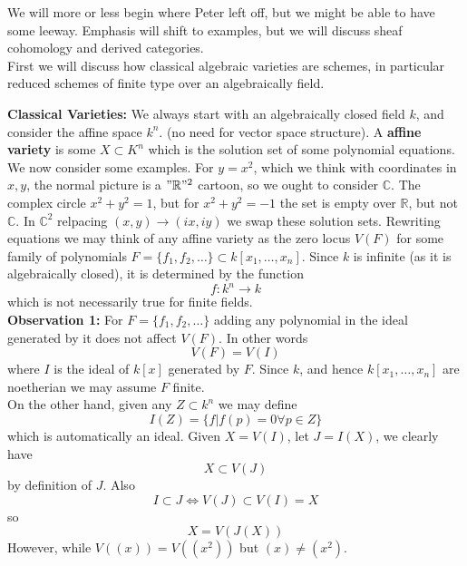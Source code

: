 \documentclass{article}
\theoremstyle{definition}
\theoremstyle{definition}
\theoremstyle{remark}
\newcommand{\R}{\mathbb{R}}
\newcommand{\C}{\mathbb{C}}
\begin{document}
We will more or less begin where Peter left off, but we might be able to have some leeway.
Emphasis will shift to examples, but we will discuss sheaf cohomology and derived categories.\\

First we will discuss how classical algebraic varieties are schemes, in particular reduced schemes of finite type over an algebraically field.

\textbf{Classical Varieties: } We always start with an algebraically closed field $k$, and consider the affine space $k^n$. (no need for vector space structure).
A \textbf{affine variety} is some $X \subset K^n$ which is the solution set of some polynomial equations. \\

We now consider some examples.
For $y = x^2$,  which we think with coordinates in $x,y$, the normal picture is a $"\R"^2$ cartoon, so we ought to consider $\C$.
The complex circle $x^2 + y^2 = 1$, but for $x^2 + y^2 = -1$ the set is empty over $\R$, but not $\C$.
In $\C^2$ relpacing $(x,y) \to (ix, iy)$ we swap these solution sets.
Rewriting equations we may think of any affine variety as the zero locus $V(F)$ for some family of polynomials $F = \{f_1, f_2, \dots\} \subset k[x_1, \dots, x_n]$.
Since $k$ is infinite (as it is algebraically closed), it is determined by the function 
\[f: k^n \to k\]
which is not necessarily true for finite fields. \\

\textbf{Observation 1: } For $F = \{f_1, f_2, \dots\}$ adding any polynomial in the ideal generated by it does not affect $V(F)$.
In other words 
\[V(F) = V(I)\]
where $I$ is the ideal of $k[x]$ generated by $F$.
Since $k$, and hence $k[x_1, \dots, x_n]$ are noetherian we may assume $F$ finite.\\

On the other hand, given any $Z \subset k^n$ we may define
\[I(Z) = \{f| f(p) = 0 \forall p \in Z\}\]
which is automatically an ideal.
Given $X = V(I)$, let $J = I(X)$, we clearly have 
\[X \subset V(J)\]
by definition of $J$.
Also
\[I \subset J \Longleftrightarrow V(J) \subset V(I) = X\]
so 
\[X = V(J(X))\]
However, while $V((x)) = V((x^2))$ but $(x) \neq (x^2)$.\\
\end{document}
